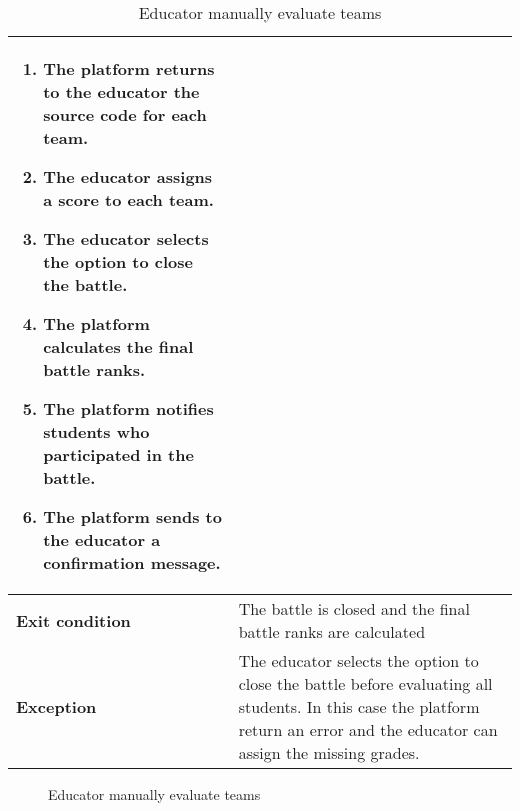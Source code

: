 \begin{enumerate}[label=\textbf{UC\arabic*}:,ref=UC\arabic*,leftmargin=1.3cm]
{\begin{table}[H]
\begin{tabular}{|l|p{11.9cm}|}
\begin{enumerate}[label=\arabic*.]
                              \item The platform returns to the educator the source code for each team.
                              \item The educator assigns a score to each team.
                              \item The educator selects the option to close the battle.
                              \item The platform calculates the final battle ranks.
                              \item The platform notifies students who participated in the battle.
                              \item The platform sends to the educator a confirmation message.
                        \end{enumerate}                 \\\hline
                        \textbf{Exit condition}  & The battle is closed and the final battle ranks are calculated                      \\\hline
                        \textbf{Exception}       & The educator selects the option to close the battle before evaluating all students.
                        In this case the platform return an error and the educator can assign the missing grades.                      \\\hline
                  \end{tabular}
                  \caption{Educator manually evaluate teams    }
                  \label{table:Educator manually evaluate teams    }
            \end{table}
            \begin{figure}[H]
                  \centering
                  \caption{Educator manually evaluate teams    }
                  \label{fig:Educator manually evaluate teams    }
            \end{figure}
            \pagebreak
      }
\end{enumerate}
